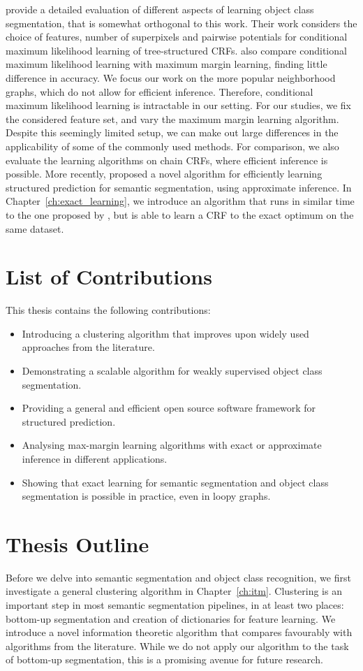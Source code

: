 \citet{nowozin2010parameter} provide a detailed evaluation of different aspects
of learning object class segmentation, that is somewhat orthogonal to this
work. Their work considers the choice of features, number of superpixels and
pairwise potentials for conditional maximum likelihood learning of
tree-structured CRFs.  \citet{nowozin2010parameter} also compare conditional
maximum likelihood learning with maximum margin learning, finding little
difference in accuracy.
We focus our work on the more popular neighborhood graphs, which do not allow
for efficient inference.  Therefore, conditional maximum likelihood learning is
intractable in our setting. For our studies, we fix the considered feature set,
and vary the maximum margin learning algorithm. Despite this seemingly limited
setup, we can make out large differences in the applicability of some of the
commonly used methods. For comparison, we also evaluate the learning algorithms
on chain CRFs, where efficient inference is possible.
More recently, \citet{lucchi2013learning} proposed a novel algorithm for
efficiently learning structured prediction for semantic segmentation, using
approximate inference. In Chapter~\ref{ch:exact_learning}, we introduce an
algorithm that runs in similar time to the one proposed by
\citet{lucchi2013learning}, but is able to learn a CRF to the exact optimum on
the same dataset.


\section{List of Contributions}
This thesis contains the following contributions:
\begin{itemize}
\item Introducing a clustering algorithm that improves upon widely used
    approaches from the literature.
\item Demonstrating a scalable algorithm for weakly supervised object class segmentation.
\item Providing a general and efficient open source software framework for structured prediction.
\item Analysing max-margin learning algorithms with exact or approximate inference in different applications.
\item Showing that exact learning for semantic segmentation and object class
    segmentation is possible in practice, even in loopy graphs.
\end{itemize}

\section{Thesis Outline}
Before we delve into semantic segmentation and object class recognition, we
first investigate a general clustering algorithm in Chapter~\ref{ch:itm}.
Clustering is an important step in most semantic segmentation pipelines, in at
least two places: bottom-up segmentation and creation of dictionaries for
feature learning. We introduce a novel information theoretic algorithm that
compares favourably with algorithms from the literature.  While we do not apply
our algorithm to the task of bottom-up segmentation, this is a promising avenue
for future research.

